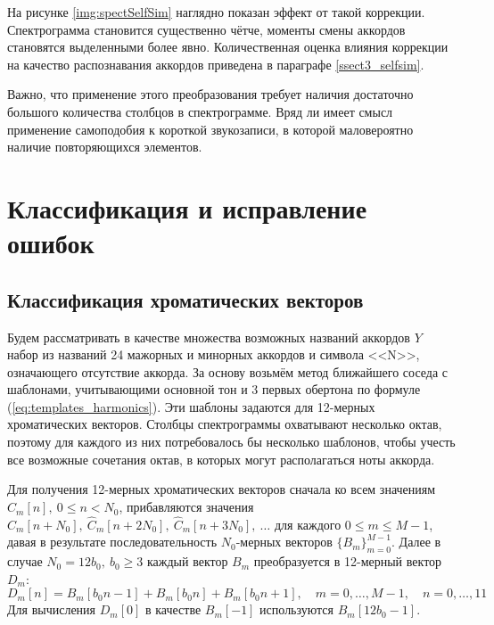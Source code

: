 На рисунке \ref{img:spectSelfSim} наглядно показан эффект от такой коррекции.
Спектрограмма становится существенно чётче, моменты смены аккордов становятся
выделенными более явно. Количественная оценка влияния коррекции на качество
распознавания аккордов приведена в параграфе \ref{ssect3_selfsim}.

Важно, что применение этого преобразования требует наличия достаточно большого
количества столбцов в спектрограмме. Вряд ли имеет смысл применение самоподобия
к короткой звукозаписи, в которой маловероятно наличие повторяющихся элементов. 



\section{Классификация и исправление ошибок} \label{sect1_class}

\subsection{Классификация хроматических векторов} \label{ssect1_chroma}

Будем рассматривать в качестве множества возможных названий аккордов $Y$ набор
из названий 24 мажорных и минорных аккордов и символа <<N>>, означающего
отсутствие аккорда. За основу возьмём метод ближайшего соседа с шаблонами,
учитывающими основной тон и 3 первых обертона по формуле
(\ref{eq:templates_harmonics}). Эти шаблоны задаются для 12-мерных хроматических
векторов. Столбцы спектрограммы охватывают несколько октав, поэтому для каждого
из них потребовалось бы несколько шаблонов, чтобы учесть все возможные
сочетания октав, в которых могут располагаться ноты аккорда.

Для получения 12-мерных хроматических векторов сначала ко всем значениям
$\widehat{C}_m[n], ~ 0 \leq n < N_0$, прибавляются значения
$\widehat{C}_m[n+N_0], ~ \widehat{C}_m[n+2N_0], ~ \widehat{C}_m[n+3N_0], ~
\ldots$ для каждого $0 \leq m \leq M-1$, давая в результате последовательность
$N_0$-мерных векторов $\{B_m\}_{m=0}^{M-1}$. Далее в случае $N_0=12 b_0, ~ b_0
\geq 3$ каждый вектор $B_m$ преобразуется в 12-мерный вектор $D_m$:
$$ D_m[n] = B_m[b_0 n - 1] + B_m[b_0 n] + B_m[b_0 n + 1], \quad m=0,\dots,M-1,
\quad n=0,\dots,11 $$ 
Для вычисления $D_m[0]$ в качестве $B_m[-1]$ используются $B_m[12 b_0 - 1]$.

